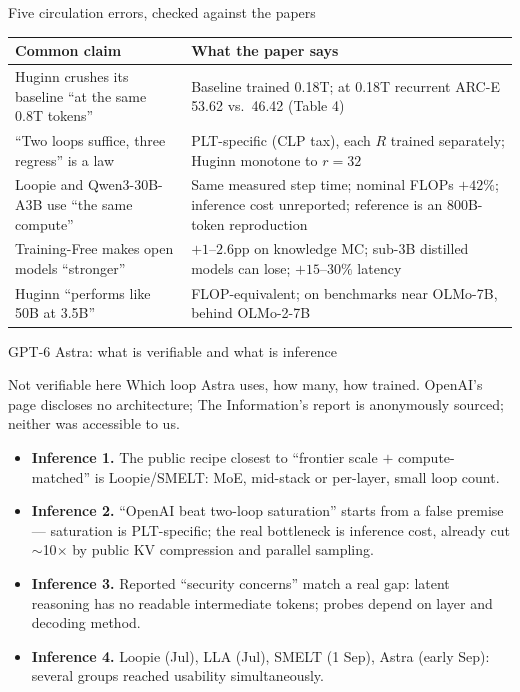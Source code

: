 \documentclass[aspectratio=169,10pt]{beamer}
\begin{document}
\begin{frame}{Five circulation errors, checked against the papers}
  \vspace{4pt}
  \begin{center}
  \small
  \begin{tabular}{@{}p{}p{}@{}}
    \toprule
    Common claim & What the paper says \\
    \midrule
    Huginn crushes its baseline ``at the same 0.8T tokens'' & Baseline trained 0.18T; at 0.18T recurrent ARC-E 53.62 vs.\ 46.42 (Table 4) \\
    ``Two loops suffice, three regress'' is a law & PLT-specific (CLP tax), each $R$ trained separately; Huginn monotone to $r{=}32$ \\
    Loopie and Qwen3-30B-A3B use ``the same compute'' & Same measured step time; nominal FLOPs $+42\%$; inference cost unreported; reference is an 800B-token reproduction \\
    Training-Free makes open models ``stronger'' & $+1$--$2.6$pp on knowledge MC; sub-3B distilled models can lose; $+15$--$30\%$ latency \\
    Huginn ``performs like 50B at 3.5B'' & FLOP-equivalent; on benchmarks near OLMo-7B, behind OLMo-2-7B \\
    \bottomrule
  \end{tabular}
  \end{center}
\end{frame}

\begin{frame}{GPT-6 Astra: what is verifiable and what is inference}
  \begin{alertblock}{Not verifiable here}
    Which loop Astra uses, how many, how trained. OpenAI's page discloses no architecture; The Information's report is anonymously sourced; neither was accessible to us.
  \end{alertblock}
  \begin{itemize}
    \item \textbf{Inference 1.} The public recipe closest to ``frontier scale $+$ compute-matched'' is Loopie/SMELT: MoE, mid-stack or per-layer, small loop count.
    \item \textbf{Inference 2.} ``OpenAI beat two-loop saturation'' starts from a false premise --- saturation is PLT-specific; the real bottleneck is inference cost, already cut $\sim$10$\times$ by public KV compression and parallel sampling.
    \item \textbf{Inference 3.} Reported ``security concerns'' match a real gap: latent reasoning has no readable intermediate tokens; probes depend on layer and decoding method.
    \item \textbf{Inference 4.} Loopie (Jul), LLA (Jul), SMELT (1 Sep), Astra (early Sep): several groups reached usability simultaneously.
  \end{itemize}
\end{frame}
\end{document}
